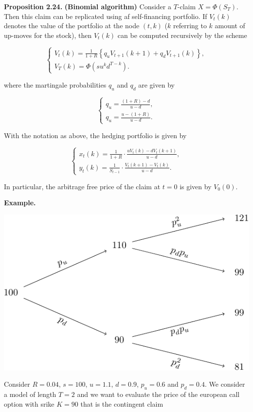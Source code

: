 \documentclass[
]{article}
\begin{document}
\textbf{Proposition 2.24.} \textbf{(Binomial algorithm)} Consider a
\(T\)-claim \(X=\Phi(S_T)\). Then this claim can be replicated using af
self-financing portfolio. If \(V_t(k)\) denotes the value of the
portfolio at the node \((t,k)\) (\(k\) referring to \(k\) amount of
up-moves for the stock), then \(V_t(k)\) can be computed recursively by
the scheme

\[
\left\{\begin{matrix}V_t(k)=\frac{1}{1+R}\left\{q_uV_{t+1}(k+1)+q_dV_{t+1}(k)\right\},\\ V_T(k)=\Phi(su^kd^{T-k}).\end{matrix}\right.
\]

where the martingale probabilities \(q_u\) and \(q_d\) are given by

\[
\left\{\begin{matrix}q_u=\frac{(1+R)-d}{u-d},\\ q_u=\frac{u-(1+R)}{u-d}.\end{matrix}\right.
\]

With the notation as above, the hedging portfolio is given by

\[
\left\{\begin{matrix}x_t(k)=\frac{1}{1+R}\cdot\frac{uV_t(k)-dV_t(k+1)}{u-d},\\ y_t(k)=\frac{1}{S_{t-1}}\cdot\frac{V_t(k+1)-V_t(k)}{u-d}.\end{matrix}\right.
\]

In particular, the arbitrage free price of the claim at \(t=0\) is given
by \(V_0(0)\).

\textbf{Example.}

\includegraphics{FinKont_homework_files/figure-latex/unnamed-chunk-4-1.pdf}

Consider \(R=0.04\), \(s=100\), \(u=1.1\), \(d=0.9\), \(p_u=0.6\) and
\(p_d=0.4\). We consider a model of length \(T=2\) and we want to
evaluate the price of the european call option with srike \(K=90\) that
is the contingent claim
\end{document}
